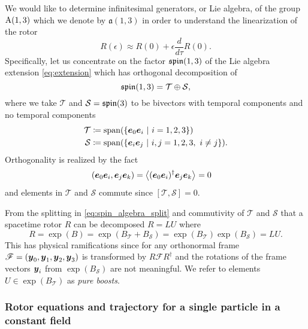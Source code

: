 \documentclass[conf]{new-aiaa}
\begin{document}
We would like to determine infinitesimal generators, or Lie algebra, of the group $\operatorname{A}(1,3)$ which we denote by $\mathfrak{a}(1,3)$ in order to understand the linearization of the rotor
\begin{equation}
\label{eq:linearization_rotor}
R(\epsilon) \approx R(0)+\epsilon\frac{d}{d\tau}R(0).
\end{equation}
Specifically, let us concentrate on the factor $\mathfrak{spin}(1,3)$ of the Lie algebra extension \cref{eq:extension} which has orthogonal decomposition of 
\begin{equation}
    \label{eq:spin_algebra_split}
    \mathfrak{spin}(1,3) = \mathcal{T} \oplus \mathcal{S},
\end{equation}
where we take $\mathcal{T}$ and $\mathcal{S}=\mathfrak{spin}(3)$ to be bivectors with temporal components and no temporal components
\begin{align}
    \mathcal{T} &\coloneqq \mathrm{span}(\{\boldsymbol{e}_0 \boldsymbol{e}_i ~\vert~ i = 1,2,3\})\\
    \mathcal{S} &\coloneqq \mathrm{span}(\{\boldsymbol{e}_i \boldsymbol{e}_j ~\vert~ i,j = 1,2,3, ~ i\neq j\}).
\end{align}
Orthogonality is realized by the fact
\begin{align}
    (\boldsymbol{e}_0 \boldsymbol{e}_i, \boldsymbol{e}_j \boldsymbol{e}_k) &= \left\langle(\boldsymbol{e}_0 \boldsymbol{e}_i)^\dagger \boldsymbol{e}_j \boldsymbol{e}_k\right\rangle_{} = 0
\end{align}
and elements in $\mathcal{T}$ and $\mathcal{S}$ commute since $[\mathcal{T},\mathcal{S}]=0$.

From the splitting in \cref{eq:spin_algebra_split} and commutivity of $\mathcal{T}$ and $\mathcal{S}$ that a spacetime rotor $R$ can be decomposed $R=LU$ where
\begin{equation}
    R = \exp(B) = \exp(B_\mathcal{T}+B_\mathcal{S})=\exp(B_\mathcal{T})\exp(B_\mathcal{S})=LU.
\end{equation}
This has physical ramifications since for any orthonormal frame $\mathscr{F}=(\boldsymbol{y}_0,\boldsymbol{y}_1,\boldsymbol{y}_2,\boldsymbol{y}_3)$ is transformed by $R\mathscr{F} R^\dagger$ and the rotations of the frame vectors $\boldsymbol{y}_i$ from $\exp(B_\mathcal{S})$ are not  meaningful. We refer to elements $U\in \exp(B_\mathcal{T})$ as \emph{pure boosts}.

\subsubsection{Rotor equations and trajectory for a single particle in a constant field}
\end{document}
